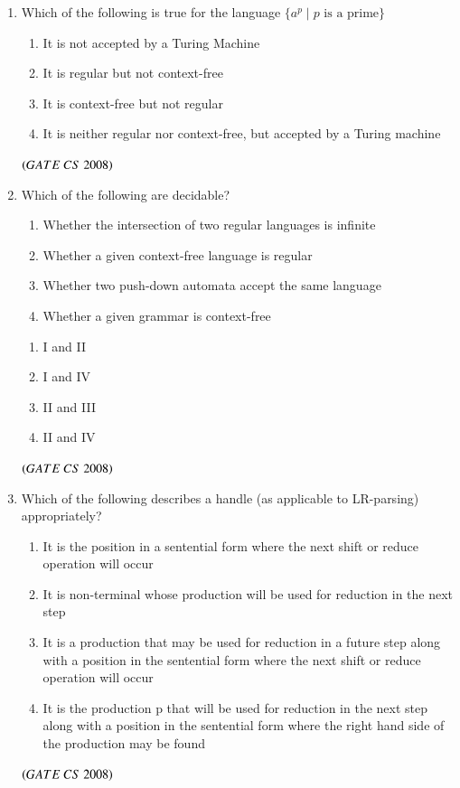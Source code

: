 \documentclass[journal, onecolumn]{IEEEtran}
\numberwithin{equation}{enumi}
\numberwithin{figure}{enumi}
\begin{document}
\begin{enumerate}
\item Which of the following is true for the language $\{a^p \mid p \text{ is a prime}\}$
 \begin{enumerate}
    \item It is not accepted by a Turing Machine 
    \item It is regular but not context-free 
    \item It is context-free but not regular 
    \item It is neither regular nor context-free, but accepted by a Turing machine 
\end{enumerate}
\hfill $\left(GATE\ CS\  2008\right)$
\bigskip
\item Which of the following are decidable? 
\begin{enumerate} [label=\Roman*.]
    \item Whether the intersection of two regular languages is infinite  
    \item Whether a given context-free language is regular  
    \item  Whether two push-down automata accept the same language 
    \item Whether a given grammar is context-free 
\end{enumerate}
\begin{multicols}{4}
\begin{enumerate}
   \item I and II
    \item I and IV
    \item II and III
    \item II and IV
\end{enumerate}
\end{multicols}
\hfill $\left(GATE\ CS\  2008\right)$

\item Which of the following describes a handle (as applicable to LR-parsing) 
appropriately? 
\begin{enumerate}
    \item It is the position in a sentential form where the next shift or reduce operation will occur
    \item It is non-terminal whose production will be used for reduction in the next step 
    \item It is a production that may be used for reduction in a future step along with a position in the sentential form where the next shift or reduce operation will occur
    \item It is the production p that will be used for reduction in the next step along with a position in the sentential form where the right hand side of the production may be found 
\end{enumerate}
\hfill $\left(GATE\ CS\  2008\right)$
\bigskip


\end{enumerate}
\end{document}
